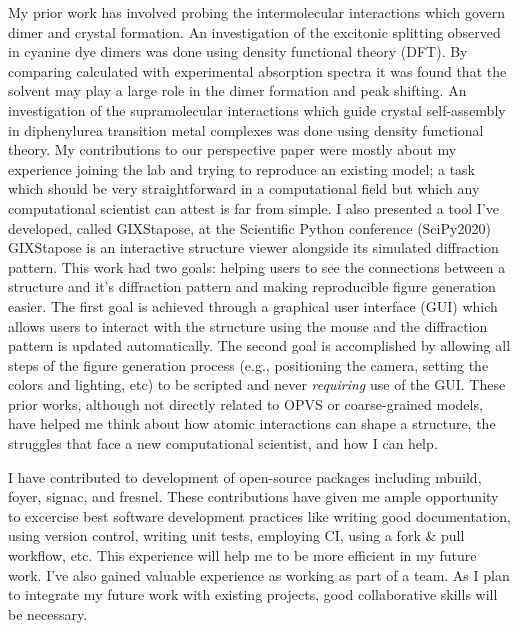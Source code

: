 My prior work has involved probing the intermolecular interactions which govern dimer and crystal formation.
An investigation of the excitonic splitting observed in cyanine dye dimers was done using density functional theory (DFT)\cite{Fothergill2018}.
By comparing calculated with experimental absorption spectra it was found that the solvent may play a large role in the dimer formation and peak shifting.
An investigation of the supramolecular interactions which guide crystal self-assembly in diphenylurea transition metal complexes was done using density functional theory\cite{Millard2019a}. 
My contributions to our perspective paper were mostly about my experience joining the lab and trying to reproduce an existing model; a task which should be very straightforward in a computational field but which any computational scientist can attest is far from simple\cite{Jankowski2019}. 
I also presented a tool I've developed, called GIXStapose, at the Scientific Python conference (SciPy2020)\cite{gixstapose, scipy2020}
GIXStapose is an interactive structure viewer alongside its simulated diffraction pattern.
This work had two goals: helping users to see the connections between a structure and it's diffraction pattern and making reproducible figure generation easier.
The first goal is achieved through a graphical user interface (GUI) which allows users to interact with the structure using the mouse and the diffraction pattern is updated automatically.
The second goal is accomplished by allowing all steps of the figure generation process (e.g., positioning the camera, setting the colors and lighting, etc) to be scripted and never \textit{requiring} use of the GUI\@.
These prior works, although not directly related to OPVS or coarse-grained models, have helped me think about how atomic interactions can shape a structure, the struggles that face a new computational scientist, and how I can help.

I have contributed to development of open-source packages including mbuild, foyer, signac, and fresnel\cite{mbuild, foyer, signac, fresnel}.
These contributions have given me ample opportunity to excercise best software development practices like writing good documentation, using version control, writing unit tests, employing CI, using a fork \& pull workflow, etc.
This experience will help me to be more efficient in my future work.
I've also gained valuable experience as working as part of a team.
As I plan to integrate my future work with existing projects, good collaborative skills will be necessary.

